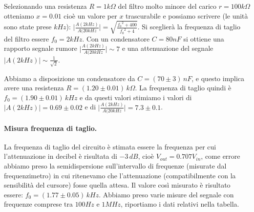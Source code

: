 \documentclass[10pt,a4paper]{article}
\begin{document}
Selezionando una resistenza $R = 1 k\Omega$ del filtro molto minore del carico $r = 100 k\Omega$ otteniamo $x = 0.01$ cioè un valore per $x$ trascurabile e possiamo scrivere (le unità sono state prese $kHz$): 
$\vert \frac{A(2 kHz)}{A(20 kHz} \vert = \sqrt{\frac{{f_0}^2  + 400}{{f_0}^2 + 4}}$. Si sceglierà la frequenza di taglio del filtro essere $f_0 = 2kHz$. Con un condensatore $C = 80 nF$ si ottiene una rapporto segnale rumore $\vert \frac{A(2 kHz)}{A(20 kHz} \vert \sim 7$ e una attenuazione del segnale $\vert A(2 kHz) \vert \sim \frac{1}{\sqrt{2}}$.

Abbiamo a disposizione un condensatore da $C = (70 \pm 3) \, nF$, e questo implica avere una resistenza $R = (1.20 \pm 0.01) \, k\Omega$.
La frequenza di taglio quindi è $f_0 = (1.90 \pm 0.01) \, kHz$ e da questi valori stimiamo i valori di $\vert A(2 kHz) \vert = 0.69 \pm 0.02 $ e di $\vert \frac{A(2 kHz)}{A(20 kHz} \vert = 7.3 \pm 0.1$.

\paragraph{Misura frequenza di taglio.}

La frequenza di taglio del circuito è stimata essere la frequenza per cui l'attenuazione in decibel è risultata di $-3\,dB$, cioè $V_{out} = 0.707 V_{in}$, come errore abbiamo preso la semidispersione sull'intervallo di frequenze (misurate dal frequenzimetro) in cui ritenevamo che l'attenuazione (compatibilmente con la sensibilità del cursore) fosse quella attesa. Il valore così misurato è risultato essere: $f_0 = (1.77 \pm 0.05) \, kHz$. 
Abbiamo preso varie misure del segnale con frequenze comprese tra $100Hz$ e $1MHz$, riportiamo i dati relativi nella tabella.
\end{document}
